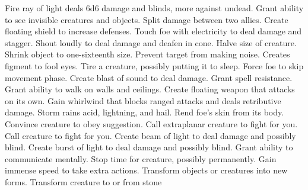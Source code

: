     {Fire ray of light deals 6d6 damage and blinds, more against undead.}
    {Grant ability to see invisible creatures and objects.}
    {Split damage between two allies.}
    {Create floating shield to increase defenses.}
    {Touch foe with electricity to deal damage and stagger.}
    {Shout loudly to deal damage and deafen in cone.}
    {Halve size of creature.}
    {Shrink object to one-sixteenth size.}
    {Prevent target from making noise.}
    {Creates figment to fool eyes.}
    {Tire a creature, possibly putting it to sleep.}
    {Force foe to skip movement phase.}
    {Create blast of sound to deal damage.}
    {Grant spell resistance.}
    {Grant ability to walk on walls and ceilings.}
    {Create floating weapon that attacks on its own.}
    {Gain whirlwind that blocks ranged attacks and deals retributive damage.}
    {Storm rains acid, lightning, and hail.}
    {Rend foe's skin from its body.}
    {Convince creature to obey suggestion.}
    {Call extraplanar creature to fight for you.}
    {Call creature to fight for you.}
    {Create beam of light to deal damage and possibly blind.}
    {Create burst of light to deal damage and possibly blind.}
    {Grant ability to communicate mentally.}
    {Stop time for creature, possibly permanently.}
    {Gain immense speed to take extra actions.}
    {Transform objects or creatures into new forms.}
    {Transform creature to or from stone}
